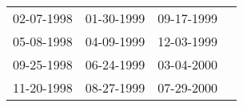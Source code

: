 \begin{supertabular}{llll}
 02-07-1998 &  01-30-1999 &  09-17-1999 \\
 05-08-1998 &  04-09-1999 &  12-03-1999 \\
 09-25-1998 &  06-24-1999 &  03-04-2000 \\
 11-20-1998 &  08-27-1999 &  07-29-2000 \\
\end{supertabular}
